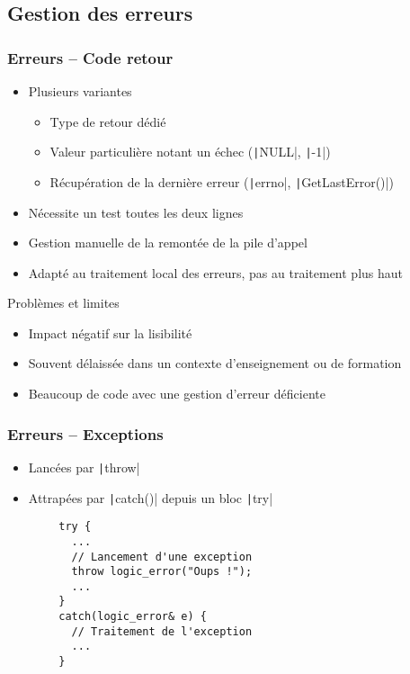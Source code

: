 \documentclass[C++.tex]{subfiles}
\begin{document}
\subsection*{Gestion des erreurs}
\begin{frame}[fragile]
	\frametitle{Erreurs -- Code retour}
	\begin{itemize}
		\item Plusieurs variantes
		\begin{itemize}
			\item Type de retour dédié
			\item Valeur particulière notant un échec (\texttt|NULL|, \texttt|-1|)
			\item Récupération de la dernière erreur (\texttt|errno|, \texttt|GetLastError()|)
		\end{itemize}
		\item Nécessite \og un test toutes les deux lignes\fg{}
		\item Gestion manuelle de la remontée de la pile d'appel
		\item Adapté au traitement local des erreurs, pas au traitement \og plus haut\fg{}
	\end{itemize}

	\begin{alertblock}{Problèmes et limites}
		\begin{itemize}
			\item Impact négatif sur la lisibilité
			\item Souvent délaissée dans un contexte d'enseignement ou de formation
			\item Beaucoup de code avec une gestion d'erreur déficiente
		\end{itemize}
	\end{alertblock}
\end{frame}

\begin{frame}[fragile]
	\frametitle{Erreurs -- Exceptions}
	\begin{itemize}
		\item Lancées par \texttt|throw|
		\item Attrapées par \texttt|catch()| depuis un bloc \texttt|try|
	\end{itemize}

	\begin{verbatim}
		try {
		  ...
		  // Lancement d'une exception
		  throw logic_error("Oups !");
		  ...
		}
		catch(logic_error& e) {
		  // Traitement de l'exception 
		  ...
		}
	\end{verbatim}
\end{frame}
\end{document}
